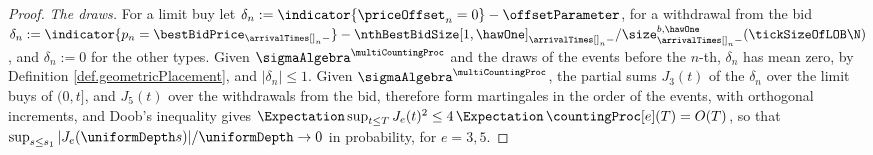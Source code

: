\begin{proof}
 \emph{The draws.}
 For a limit buy let $\delta_n := \indicator{\priceOffset_n = 0} - \offsetParameter$,
 for a withdrawal from the bid
 $\delta_n := \indicator{p_n = \bestBidPrice_{\arrivalTimes[]_n-}}
 - \nthBestBidSize[1,\hawOne]_{\arrivalTimes[]_n-}
 / \size^{b,\hawOne}_{\arrivalTimes[]_n-}(\tickSizeOfLOB\N)$,
 and $\delta_n := 0$ for the other types.
 Given $\sigmaAlgebra^{\multiCountingProc}$ and the draws of the events before the $n$-th,
 $\delta_n$ has mean zero, by Definition \ref{def.geometricPlacement},
 and $\vert \delta_n \vert \leq 1$.
 Given $\sigmaAlgebra^{\multiCountingProc}$,
 the partial sums $J_3(t)$ of the $\delta_n$ over the limit buys of $(0, t]$,
 and $J_5(t)$ over the withdrawals from the bid,
 therefore form martingales in the order of the events,
 with orthogonal increments,
 and Doob's inequality gives
 $\Expectation \sup_{t \leq T} J_e(t)^{2} \leq 4\,\Expectation\,\countingProc[e](T) = O(T)$,
 so that $\sup_{s \leq s_1} \vert J_e(\uniformDepth s) \vert / \uniformDepth \to 0$ in
 probability, for $e = 3, 5$.


\end{proof}
